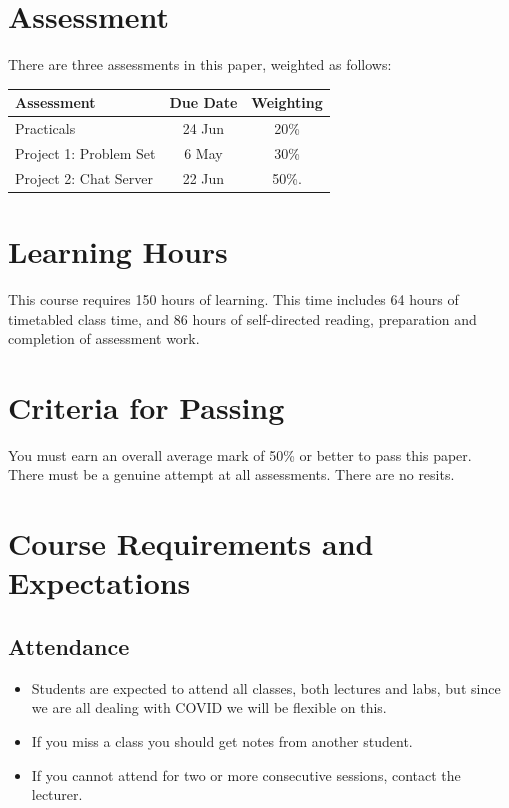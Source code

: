 \documentclass{article}
\begin{document}
\section*{Assessment}
There are three assessments in this paper, weighted as follows:


\begin{tabular}{|l|c|c|}
\hline
Assessment                    & Due Date       & Weighting \\ \hline
Practicals                    & 24 Jun         & 20\% \\ \hline
Project 1: Problem  Set       &  6 May         & 30\% \\ \hline
Project 2: Chat Server        & 22 Jun         & 50\%. \\ \hline
\end{tabular}

\section*{Learning Hours}
This course requires 150 hours of learning. This time includes 64 hours of timetabled class time, and 86 
hours of self-directed reading, preparation and completion of assessment work.


\section*{Criteria for Passing}
You must earn an overall average mark of 50\% or better to pass this paper. There must be a genuine 
attempt at all assessments. There are no resits.

\section*{Course Requirements and Expectations}
\subsection*{Attendance}
\begin{itemize}
 \item Students are expected to attend all classes, both lectures and labs, but since we are all dealing with COVID we will be flexible on this.
 \item If you miss a class you should get notes from another student.
 \item If you cannot attend for two or more consecutive sessions, contact the lecturer.
\end{itemize}
\end{document}
